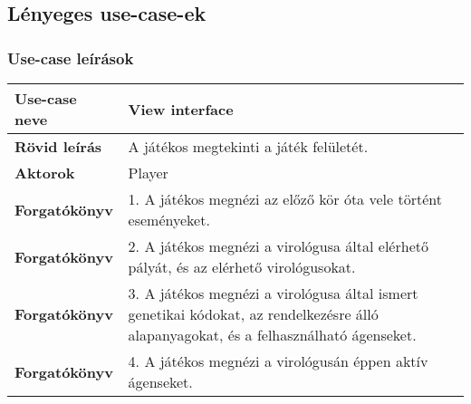 
\subsection{Lényeges use-case-ek}
\subsubsection{Use-case leírások}

\noindent\begin{tabularx}{\textwidth}{|l|X|}
	\hline
	\textbf{Use-case neve} & \textbf{View interface}                                                                                                               \\
	\hline
	\hline
	\textbf{Rövid leírás}  & A játékos megtekinti a játék felületét.                                                                                               \\
	\hline
	\textbf{Aktorok}       & Player                                                                                                                                \\
	\hline
	\textbf{Forgatókönyv}  & 1. A játékos megnézi az előző kör óta vele történt eseményeket.                                                                       \\
	\hline
	\textbf{Forgatókönyv}  & 2. A játékos megnézi a virológusa által elérhető pályát, és az elérhető virológusokat.                                                \\
	\hline
	\textbf{Forgatókönyv}  & 3. A játékos megnézi a virológusa által ismert genetikai kódokat, az rendelkezésre álló alapanyagokat, és a felhasználható ágenseket. \\
	\hline
	\textbf{Forgatókönyv}  & 4. A játékos megnézi a virológusán éppen aktív ágenseket.                                                                             \\
	\hline
\end{tabularx}

\bigskip

